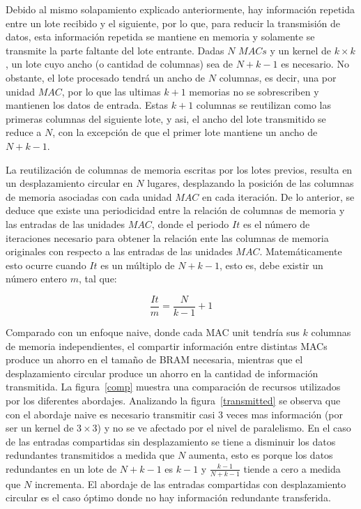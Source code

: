 Debido al mismo solapamiento explicado anteriormente, hay información repetida entre
un lote recibido y el siguiente, por lo que, para reducir la transmisión de
datos, esta información repetida se mantiene en memoria y solamente se transmite
la parte faltante del lote entrante. Dadas $N$ $MACs$ y un kernel de $k \times k$,
un lote cuyo ancho (o cantidad de columnas) sea de $N+k-1$ es necesario. No
obstante, el lote procesado tendrá un ancho de  $N$ columnas, es decir, una por
unidad $MAC$, por lo que las ultimas $k+1$ memorias no se sobrescriben y
mantienen los datos de entrada. Estas $k+1$ columnas se reutilizan como las
primeras columnas del siguiente lote, y asi, el ancho del lote transmitido se
reduce a $N$, con la excepción de que el primer lote mantiene un ancho de
$N+k-1$.

La reutilización de columnas de memoria escritas por los lotes previos, resulta
en un desplazamiento circular en $N$ lugares, desplazando la posición de las
columnas de memoria asociadas con cada unidad $MAC$ en cada iteración. De lo
anterior, se deduce que existe una periodicidad entre la relación de columnas de
memoria y las entradas de las unidades $MAC$, donde el periodo $It$ es el número
de iteraciones necesario para obtener la relación ente las columnas de memoria
originales con respecto a las entradas de las unidades $MAC$. Matemáticamente
esto ocurre cuando $It$ es un múltiplo de $N+k-1$, esto es, debe existir un
número entero $m$, tal que:

\begin{equation}\label{niter}
  \frac{It}{m} = \frac{N}{k-1} + 1
\end{equation}

Comparado con un enfoque naive, donde cada MAC unit tendría sus $k$ columnas de
memoria independientes, el compartir información entre distintas MACs produce un
ahorro en el tamaño de BRAM necesaria, mientras que el desplazamiento circular
produce un ahorro en la cantidad de información transmitida. La
figura~\ref{comp} muestra una comparación de recursos utilizados por los
diferentes abordajes. Analizando la figura~\ref{transmitted} se observa que con el
abordaje naive es necesario transmitir casi 3 veces mas información (por ser un
kernel de $3 \times 3$) y no se ve afectado por el nivel de paralelismo.
En el caso de las entradas compartidas sin desplazamiento se tiene a disminuir
los datos redundantes transmitidos a medida que $N$ aumenta, esto es porque los
datos redundantes en un lote de $N+k-1$ es $k-1$ y $\frac{k-1}{N+k-1}$ tiende a
cero a medida que $N$ incrementa. El abordaje de las entradas compartidas con
desplazamiento circular es el caso óptimo donde no hay información redundante
transferida.

